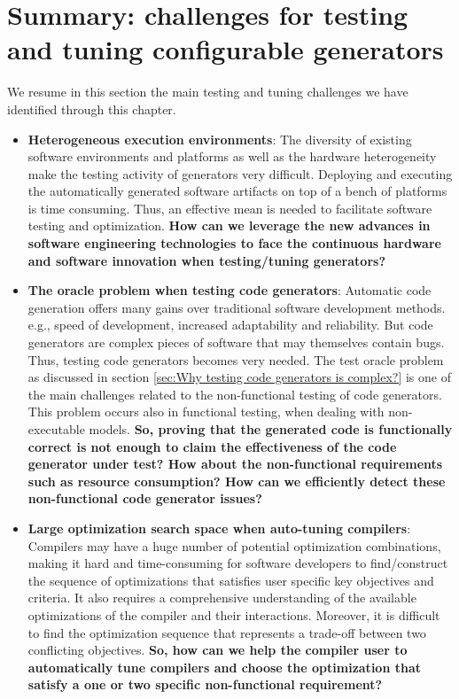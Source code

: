 \section{Summary: challenges for testing and tuning configurable generators}
\label{bg:Summary: Testing and optimization challenges}
We resume in this section the main testing and tuning challenges we have identified through this chapter.
\begin{itemize}
	\item \textbf{Heterogeneous execution environments}: 
	The diversity of existing software environments and platforms as well as the hardware heterogeneity make the testing activity of generators very difficult. Deploying and executing the automatically generated software artifacts on top of a bench of platforms is time consuming. Thus, an effective mean is needed to facilitate software testing and optimization.
	\textbf{How can we leverage the new advances in software engineering technologies to face the continuous hardware and software innovation when testing/tuning generators?} 
	
    \item \textbf{The oracle problem when testing code generators}: 	
	Automatic code generation offers many gains over traditional software development methods. e.g., speed of development, increased adaptability and reliability. But code generators are complex pieces of software that may themselves contain bugs. Thus, testing code generators becomes very needed. The test oracle problem as discussed in section \ref{sec:Why testing code generators is complex?} is one of the main challenges related to the non-functional testing of code generators. This problem occurs also in functional testing, when dealing with non-executable models.
	\textbf{
	So, proving that the generated code is functionally correct is not enough to claim the effectiveness of the code generator under test? How about the non-functional requirements such as resource consumption?
	How can we efficiently detect these non-functional code generator issues?}
	
	\item \textbf{Large optimization search space when auto-tuning compilers}: 
	Compilers may have a huge number of potential optimization combinations, making it hard and time-consuming for software developers to find/construct the sequence of optimizations that satisfies user specific key objectives and criteria. It also requires a comprehensive understanding of the available optimizations of the compiler and their interactions. Moreover, it is difficult to find the optimization sequence that represents a trade-off between two conflicting objectives.  
	\textbf{So, how can we help the compiler user to automatically tune compilers and choose the optimization that satisfy a one or two specific non-functional requirement? }
	

\end{itemize}
